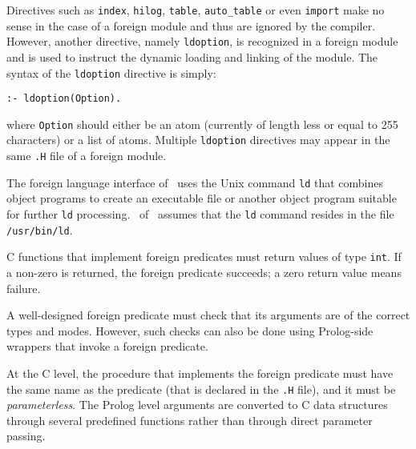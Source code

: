 Directives such as {\tt index}, {\tt hilog}, {\tt table}, {\tt auto\_table} 
or even {\tt import} make no sense in the case of a foreign module and thus 
are ignored by the compiler.  However, another directive, namely 
{\tt ldoption}, is recognized in a foreign module and is used to instruct 
the dynamic loading and linking of the module.  
The syntax of the {\tt ldoption} directive is simply:
\begin{center}
{\tt  :- ldoption(Option).    }
\end{center}
where {\tt Option} should either be an atom (currently of length less
or equal to 255 characters) or a list of atoms.  Multiple {\tt ldoption}
directives may appear in the same {\tt .H} file of a foreign module.

The foreign language interface of \ourprolog\ uses the Unix command 
{\tt ld} that combines object programs to create an executable file  
or another object program suitable for further {\tt ld} processing.
\version\ of \ourprolog\ assumes that the {\tt ld} command resides
in the file {\tt /usr/bin/ld}.

C functions that implement foreign predicates must return values of type
{\tt int}. If a non-zero is returned, the foreign predicate succeeds; a
zero return value means failure.

A well-designed foreign predicate must check that its arguments are of the
correct types and modes. However, such checks can also be done using
Prolog-side wrappers that invoke a foreign predicate.

At the C level, the procedure that implements the foreign predicate
must have the same name as the predicate (that is declared in the 
{\tt *.H} file), and it must be {\em parameterless}.  The Prolog level 
arguments are converted to C data structures through several 
predefined functions rather than through direct parameter passing.

